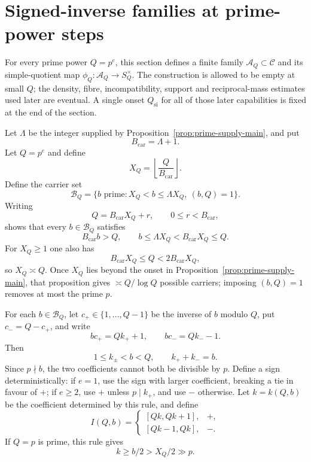 \section{Signed-inverse families at prime-power steps}
\label{sec:signed-inverse}

For every prime power $Q=p^e$, this section defines a finite family $\mathcal A_Q\subset\mathcal C$ and its simple-quotient map $\phi_Q:\mathcal A_Q\to S_Q^\times$.  The construction is allowed to be empty at small $Q$; the density, fibre, incompatibility, support and reciprocal-mass estimates used later are eventual.  A single onset $Q_{\mathrm{si}}$ for all of those later capabilities is fixed at the end of the section.

Let $\Lambda$ be the integer supplied by Proposition~\ref{prop:prime-supply-main}, and put
\[
B_{\mathrm{car}}=\Lambda+1.
\]
Let $Q=p^e$ and define
\begin{equation}\label{eq:carrier-base}
X_Q=\left\lfloor\frac{Q}{B_{\mathrm{car}}}\right\rfloor.
\end{equation}
Define the carrier set
\begin{equation}\label{eq:carrier-band}
\mathscr B_Q=
\{b\text{ prime}:X_Q<b\le\Lambda X_Q,\ (b,Q)=1\}.
\end{equation}
Writing
\[
Q=B_{\mathrm{car}}X_Q+r,
\qquad 0\le r<B_{\mathrm{car}},
\]
shows that every $b\in\mathscr B_Q$ satisfies
\begin{equation}\label{eq:carrier-exact}
B_{\mathrm{car}}b>Q,
\qquad
b\le\Lambda X_Q<B_{\mathrm{car}}X_Q\le Q.
\end{equation}
For $X_Q\ge1$ one also has
\[
B_{\mathrm{car}}X_Q\le Q<2B_{\mathrm{car}}X_Q,
\]
so $X_Q\asymp Q$.  Once $X_Q$ lies beyond the onset in Proposition~\ref{prop:prime-supply-main}, that proposition gives $\asymp Q/\log Q$ possible carriers; imposing $(b,Q)=1$ removes at most the prime $p$.

For each $b\in\mathscr B_Q$, let $c_+\in\{1,\ldots,Q-1\}$ be the inverse of $b$ modulo $Q$, put $c_-=Q-c_+$, and write
\begin{equation}\label{eq:signed-inverse}
bc_+=Qk_++1,
\qquad
bc_-=Qk_--1.
\end{equation}
Then
\[
1\le k_\pm<b<Q,
\qquad
k_++k_-=b.
\]
Since $p\nmid b$, the two coefficients cannot both be divisible by $p$.  Define a sign deterministically: if $e=1$, use the sign with larger coefficient, breaking a tie in favour of $+$; if $e\ge2$, use $+$ unless $p\mid k_+$, and use $-$ otherwise.  Let $k=k(Q,b)$ be the coefficient determined by this rule, and define
\begin{equation}\label{eq:signed-block}
I(Q,b)=
\begin{cases}
[Qk,Qk+1],&+,\\
[Qk-1,Qk],&-.
\end{cases}
\end{equation}
If $Q=p$ is prime, this rule gives
\begin{equation}\label{eq:atomic-k-lower}
k\ge b/2>X_Q/2\gg p.
\end{equation}

